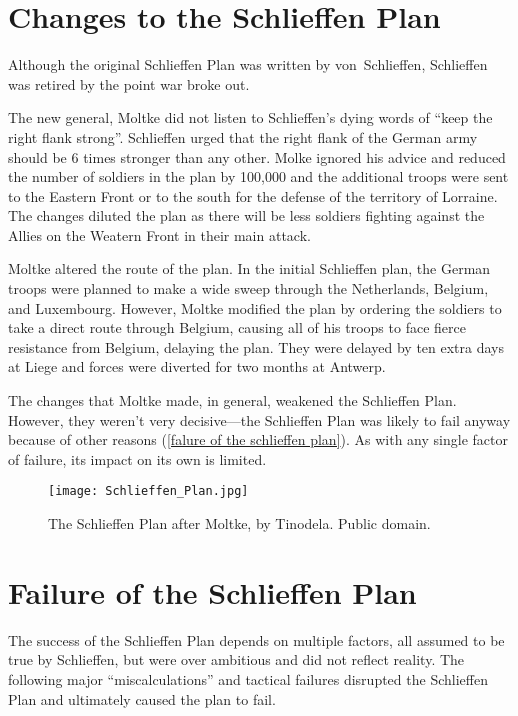 \documentclass[a4paper,numbers=endperiod,most,twoside,english,final,openany]{scrbook} %
\providecommand\vref[1]{\ref{#1}}
\begin{document}
\section{Changes to the Schlieffen Plan}

Although the original Schlieffen Plan was written by von~Schlieffen, Schlieffen was retired by the point war broke out.

The new general, Moltke did not listen to Schlieffen's dying words of “keep the right flank strong”. Schlieffen urged that the right flank of the German army should be 6 times stronger than any other. Molke ignored his advice and reduced the number of soldiers in the plan by 100,000 and the additional troops were sent to the Eastern Front or to the south for the defense of the territory of Lorraine. The changes diluted the plan as there will be less soldiers fighting against the Allies on the Weatern Front in their main attack.

Moltke altered the route of the plan. In the initial Schlieffen plan, the German troops were planned to make a wide sweep through the Netherlands, Belgium, and Luxembourg. However, Moltke modified the plan by ordering the soldiers to take a direct route through Belgium, causing all of his troops to face fierce resistance from Belgium, delaying the plan.  They were delayed by ten extra days at Liege and forces were diverted for two months at Antwerp.

The changes that Moltke made, in general, weakened the Schlieffen Plan.  However, they weren't very decisive---the Schlieffen Plan was likely to fail anyway because of other reasons (\vref{falure of the schlieffen plan}).  As with any single factor of failure, its impact on its own is limited.

\begin{figure}
    \texttt{[image: Schlieffen\_Plan.jpg]}
    \caption{The Schlieffen Plan after Moltke, by Tinodela. Public domain.}
\end{figure}

\section{Failure of the Schlieffen Plan\label{sec:Failure-of-the-Plan}}

The success of the Schlieffen Plan depends on multiple factors, all assumed to be true by Schlieffen, but were over ambitious and did not reflect reality. The following major ``miscalculations'' and tactical failures disrupted the Schlieffen Plan and ultimately caused the plan to fail.
\end{document}
